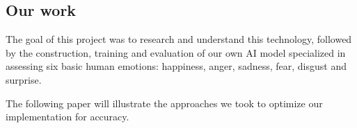 \subsection{Our work}

The goal of this project was to research and understand this technology, followed by the construction, training and evaluation of our own AI model
specialized in assessing six basic human emotions: happiness, anger, sadness, fear, disgust and surprise. 

The following paper will illustrate the approaches we took to optimize our implementation for accuracy.